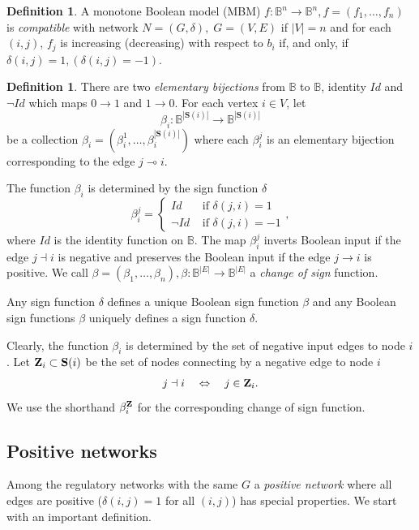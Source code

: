 \documentclass[12pt]{amsart}
\newcommand{\bZ}{{\bf Z}}
\newcommand{\bbB}{\mathbb{B}}
\newcommand{\Sources}{\mathbf{S}}
\theoremstyle{definition}
\newtheorem{defn}[thm]{Definition}
\begin{document}
\begin{defn}
A monotone Boolean model (MBM) $f \colon \bbB^n \to \bbB^n, f=(f_1, \ldots, f_n)$ is \textit{compatible} with network $N=(G,\delta),\; G=(V,E)$ if $|V|=n$ and for each $(i,j)$, $f_j$ is increasing (decreasing) with respect to $b_i$ if, and only, if $\delta(i,j) = 1,(\delta(i,j) = -1)$.
\end{defn}

\begin{defn} \label{defn:signchange}
There are two \textit{ elementary bijections} from $\bbB$ to $\bbB$, identity $Id$ and $\neg Id$ which maps $0\to 1$ and $1\to 0$. For each vertex $i\in V$, let 
\[ \beta_i: \bbB^{|\Sources(i)|} \to \bbB^{|\Sources(i)|}\]
be a collection $\beta_i=(\beta_i^1, \ldots, \beta_i^{|\Sources(i)|})$
where each $\beta_i^j$ is an elementary bijection corresponding to the edge $j\multimap i$.


The function $\beta_i$ is determined by the sign function $\delta$ 
\[ \beta^j_i = \left \{
\begin{array}{cc}
Id & \mbox{ if } \delta(j,i)=1\\
\neg Id & \mbox{ if } \delta(j,i)=-1
\end{array}
\right.
,\]
where $Id$ is the identity function on $\bbB$.
The map $\beta^j_i$ inverts Boolean input if the edge $j \dashv i$ is negative and preserves the Boolean input if the edge $j \to i$ is positive.
We call $\beta=(\beta_1, \ldots, \beta_n), \beta: \bbB^{|E|} \to \bbB^{|E|}$ a \textit{change of sign} function.
\end{defn}
Any sign function $\delta$ defines a unique Boolean sign function $\beta$ and any Boolean sign functions $\beta$ uniquely defines a sign function $\delta.$


Clearly, the function $\beta_i$ is determined by the set of negative input edges to node $i$.
Let $\bZ_i \subset \Sources(i)$ be the set of nodes connecting by a negative edge to node $i$
\begin{equation}\label{eq:Z} j \dashv i \quad \Leftrightarrow \quad j\in \bZ_i . 
\end{equation}
We use the shorthand $\beta^\bZ_i$ for the corresponding change of sign function. 



\subsection{Positive networks}

Among the regulatory networks with the same $G$
a \textit{positive network} where all edges are positive ($\delta(i,j) =1$ for all $(i,j)$) has special properties.
We start with an important definition.
\end{document}
